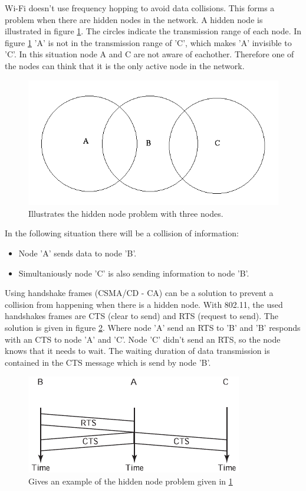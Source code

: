 \documentclass[10pt,a4paper]{article}
\begin{document}
Wi-Fi doesn't use frequency hopping to avoid data collisions. This forms a problem when there are hidden nodes in the network. A hidden node is illustrated in figure \ref{fig:hiddennode}. The circles indicate the transmission range of each node. In figure \ref{fig:hiddennode} 'A' is not in the transmission range of 'C', which makes 'A' invisible to 'C'. In this situation node A and C are not aware of eachother. Therefore one of the nodes can think that it is the only active node in the network.

\begin{figure}[H]
   \centering
   \includegraphics[width=1\textwidth]{hiddennodeproblem}
   \caption{Illustrates the hidden node problem with three nodes.}
   \label{fig:hiddennode}
\end{figure}

In the following situation there will be a collision of information:
\begin{itemize}
\setlength\itemsep{0em}
\item Node 'A' sends data to node 'B'.
\item Simultaniously node 'C' is also sending information to node 'B'.
\end{itemize}

Using handshake frames (CSMA/CD - CA) can be a solution to prevent a collision from happening when there is a hidden node. With 802.11, the used handshakes frames are CTS (clear to send) and RTS (request to send). The solution is given in figure \ref{fig:rtscts}. Where node 'A' send an RTS to 'B' and 'B' responds with an CTS to node 'A' and 'C'. Node 'C' didn't send an RTS, so the node knows that it needs to wait. The waiting duration of data transmission is contained in the CTS message which is send by node 'B'. \cite{tcipbook}

\begin{figure}[H]
   \centering
   \includegraphics[width=.75\textwidth]{rtscts}
   \caption{Gives an example of the hidden node problem given in \ref{fig:hiddennode}}
   \label{fig:rtscts}
\end{figure}
\end{document}
